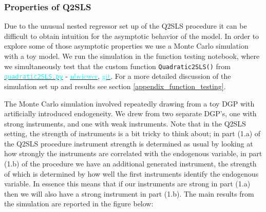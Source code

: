 \documentclass[12pt]{article}
\newcommand{\inlinecode}{\texttt}
\begin{document}
\subsubsection{Properties of Q2SLS} \label{q2sls_properties}
Due to the unusual nested regressor set up of the Q2SLS procedure it can be difficult to obtain intuition for the asymptotic behavior of the model. In order to explore some of those asymptotic properties we use a Monte Carlo simulation with a toy model. We run the simulation in the function testing notebook, where we simultaneously test that the custom function \inlinecode{Quadratic2SLS()} from \href{https://github.com/nadavtadelis/Reproducible_Metrics/blob/master/quadratic2SLS.py}{\textcolor{cyan}{\inlinecode{quadratic2SLS.py}}} - \href{https://nbviewer.jupyter.org/github/nadavtadelis/Reproducible_Metrics/blob/master/function_testing.ipynb}{\textcolor{cyan}{nbviewer}}, \href{https://github.com/nadavtadelis/Reproducible_Metrics/blob/master/function_testing.ipynb}{\textcolor{cyan}{git}}. For a more detailed discussion of the simulation set up and results see section \ref{appendix_function_testing}.

The Monte Carlo simulation involved repeatedly drawing from a toy DGP with artificially introduced endogeneity. We drew from two separate DGP's, one with strong instruments, and one with weak instruments. Note that in the Q2SLS setting, the strength of instruments is a bit tricky to think about; in part (1.a) of the Q2SLS procedure instrument strength is determined as usual by looking at how strongly the instruments are correlated with the endogenous variable, in part (1.b) of the procedure we have an additional generated instrument, the strength of which is determined by how well the first instruments identify the endogenous variable. In essence this means that if our instruments are strong in part (1.a) then we will also have a strong instrument in part (1.b). The main results from the simulation are reported in the figure below:
\end{document}
